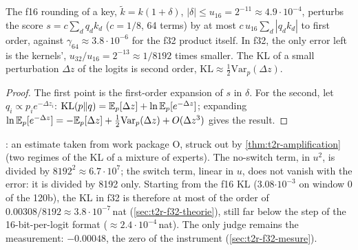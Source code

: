 \begin{proposition}\label{prop:t2n-kv}
The f16 rounding of a key, $\tilde k = k(1 + \delta)$, $|\delta| \le u_{16} = 2^{-11} \approx 4.9\cdot10^{-4}$, perturbs the score $s = c \sum_d q_d k_d$ ($c = 1/8$, 64 terms) by at most $c\,u_{16} \sum_d |q_d k_d|$ to first order, against $\gamma_{64} \approx 3.8\cdot10^{-6}$ for the f32 product itself. In f32, the only error left is the kernels', $u_{32}/u_{16} = 2^{-13} \approx 1/\num{8192}$ times smaller. The KL of a small perturbation $\Delta z$ of the logits is second order, $\mathrm{KL} \approx \tfrac12 \mathrm{Var}_p(\Delta z)$.
\end{proposition}

\begin{proof}
The first point is the first-order expansion of $s$ in $\delta$. For the second, let $q_i \propto p_i e^{-\Delta z_i}$: $\mathrm{KL}(p\|q) = \mathbb{E}_p[\Delta z] + \ln \mathbb{E}_p[e^{-\Delta z}]$; expanding $\ln \mathbb{E}_p[e^{-\Delta z}] = -\mathbb{E}_p[\Delta z] + \tfrac12 \mathrm{Var}_p(\Delta z) + O(\Delta z^3)$ gives the result.
\end{proof}

: an estimate taken from work package O, struck out by \cref{thm:t2r-amplification} (two regimes of the KL of a mixture of experts). The no-switch term, in $u^2$, is divided by $\num{8192}^2 \approx 6.7\cdot10^{7}$; the switch term, linear in $u$, does not vanish with the error: it is divided by \num{8192} only. Starting from the f16 KL (3.08$\cdot10^{-3}$ on window 0 of the 120b), the KL in f32 is therefore at most of the order of $0.00308/\num{8192} \approx 3.8\cdot10^{-7}$\,nat \calc{} (\cref{sec:t2r-f32-theorie}), still far below the step of the 16-bit-per-logit format ($\approx 2.4\cdot10^{-4}$\,nat). The only judge remains the measurement: $-0.00048$, the zero of the instrument (\cref{sec:t2r-f32-mesure}).

